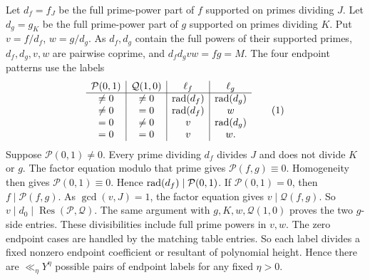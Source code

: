 \begin{enumerate}
Let \(d_f=f_J\) be the full prime-power part of \(f\) supported on primes
dividing \(J\). Let \(d_g=g_K\) be the full prime-power part of \(g\)
supported on primes dividing \(K\). Put \(v=f/d_f\), \(w=g/d_g\).
As \(d_f,d_g\) contain the full powers of their
supported primes, \(d_f,d_g,v,w\) are pairwise coprime, and
\(d_fd_gvw=fg=M\).
The four endpoint patterns use the labels
\[
\begin{array}{c|c|c|c}
 \mathcal P(0,1)&\mathcal Q(1,0)&\ell_f&\ell_g\\ \hline
 \ne0&\ne0&\rad(d_f)&\rad(d_g)\\
 \ne0&=0&\rad(d_f)&w\\
 =0&\ne0&v&\rad(d_g)\\
 =0&=0&v&w .
\end{array}                                                   \AutoTag{eq:old:7_16}
\]
Suppose \(\mathcal P(0,1)\ne0\). Every prime dividing \(d_f\) divides \(J\)
and does not divide \(K\) or \(g\). The factor equation modulo that
prime gives \(\mathcal P(f,g)\equiv0\). Homogeneity then gives
\(\mathcal P(0,1)\equiv0\). Hence \(\operatorname{rad}(d_f)\mid\mathcal P(0,1)\).
If \(\mathcal P(0,1)=0\), then \(f\mid\mathcal P(f,g)\). As
\(\gcd(v,J)=1\), the factor equation gives \(v\mid\mathcal Q(f,g)\).
So \(v\mid d_0\mid\operatorname{Res}(\mathcal P,\mathcal Q)\).
The same argument with \(g,K,w,\mathcal Q(1,0)\) proves the two
\(g\)-side entries. These divisibilities include full prime powers in
\(v,w\). The zero endpoint cases are handled by the matching table
entries. So each label divides a fixed nonzero endpoint coefficient or
resultant of polynomial height. Hence there are \(\ll_\eta Y^\eta\)
possible pairs of endpoint labels for any fixed \(\eta>0\).


\end{enumerate}
